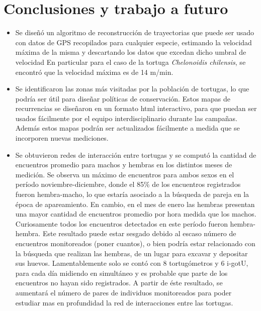 
\chapter{Conclusiones y trabajo a futuro}


\begin{itemize}

\item{    
Se diseñó un algoritmo de reconstrucción de trayectorias que puede ser usado 
con datos de GPS recopilados para cualquier especie, estimando la velocidad 
máxima de la misma y descartando los datos que excedan dicho umbral de velocidad
En particular para el caso 
de la tortuga {\it Chelonoidis chilensis}, se encontró que la velocidad máxima es 
de 14 m/min.} 

\item{Se identificaron las zonas más visitadas por la población de tortugas, 
lo que podría ser útil para diseñar políticas de conservación. 
Estos mapas de recurrencias se diseñaron en un formato html 
interactivo, para que puedan ser usados fácilmente por el equipo 
interdisciplinario durante las campañas. Además estos mapas podrán ser actualizados 
fácilmente a medida que se incorporen nuevas mediciones.}
 
\item{Se obtuvieron redes de interacción entre tortugas y se computó 
la cantidad de encuentros promedio para machos y hembras 
en los distintos meses de medición. Se observa un máximo de encuentros 
para 
ambos sexos en el período noviembre-diciembre, donde el 85\% de los 
encuentros registrados 
fueron hembra-macho, lo que estaría asociado a la búsqueda 
de pareja en la época de apareamiento. En cambio, en el mes de enero las 
hembras presentan una mayor cantidad de encuentros promedio 
por hora medida que los machos. Curiosamente todos los encuentros detectados
en este período fueron hembra-hembra. Este resultado puede estar sesgado debido
al escaso número de encuentros monitoreados (poner cuantos), o bien podría 
estar relacionado con 
la búsqueda que realizan las hembras, de un lugar para excavar y depositar sus 
huevos. 
Lamentablemente solo se contó con 8 tortugómetros y 6 i-gotU, para cada 
día midiendo en simultáneo y es probable que parte de los 
encuentros no hayan sido registrados. A partir de éste resultado, 
se aumentará el número de pares de individuos 
monitoreados para poder estudiar mas en profundidad la red de interacciones 
entre las tortugas.
} 
 

\end{itemize}
